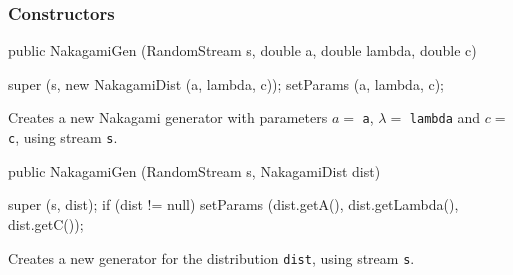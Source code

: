 \subsubsection* {Constructors}
\begin{code}

   public NakagamiGen (RandomStream s, double a, double lambda, double c) \begin{hide} {
      super (s, new NakagamiDist (a, lambda, c));
      setParams (a, lambda, c);
   }\end{hide}
\end{code}
  \begin{tabb}  Creates a new Nakagami generator with parameters $a=$ \texttt{a}, 
 $\lambda =$ \texttt{lambda} and $c =$ \texttt{c}, using stream \texttt{s}.
\end{tabb}
\begin{code}

   public NakagamiGen (RandomStream s, NakagamiDist dist) \begin{hide} {
      super (s, dist);
      if (dist != null)
         setParams (dist.getA(), dist.getLambda(), dist.getC());
   }\end{hide}
\end{code}
\begin{tabb} Creates a new generator for the distribution \texttt{dist},
     using stream \texttt{s}.
\end{tabb}


